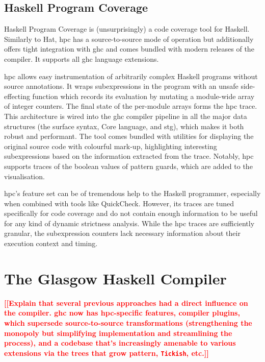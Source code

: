 \documentclass[thesis=B,english]{FITthesis}[2019/12/23]
\newcommand{\todo}[1]{\textcolor{red}{\textbf{[[#1]]}}}
\newcommand{\blind}[1][1]{\textcolor{gray}{\Blindtext[#1][1]}}
\newcommand{\hsIdent}[1]{\texttt{#1}}
\begin{document}
\subsection{Haskell Program Coverage} \label{sec:hpc}
Haskell Program Coverage\cite{hpc-paper} is (unsurprisingly) a code coverage
tool for Haskell. Similarly to Hat, \acrshort{hpc} has a source-to-source mode
of operation but additionally offers tight integration with \acrshort{ghc} and
comes bundled with modern releases of the compiler. It supports all
\acrshort{ghc} language extensions.

\acrshort{hpc} allows easy instrumentation of arbitrarily complex Haskell
programs without source annotations. It wraps subexpressions in the program
with an unsafe side-effecting function which records its evaluation by mutating
a module-wide array of integer counters. The final state of the per-module
arrays forms the \acrshort{hpc} trace. This architecture is wired into the
\acrshort{ghc} compiler pipeline in all the major data structures (the surface
syntax, Core language, and \acrshort{stg}), which makes it both robust and
per\-for\-mant. The tool comes bundled with utilities for displaying the
original source code with colourful mark-up, highlighting interesting
subexpressions based on the information extracted from the trace. Notably,
\acrshort{hpc} supports traces of the boolean values of pattern guards, which
are added to the visualisation.

\acrshort{hpc}'s feature set can be of tremendous help to the Haskell
programmer, especially when combined with tools like
QuickCheck\cite{quickcheck-paper}. However, its traces are tuned specifically
for code coverage and do not contain enough information to be useful for any
kind of dynamic strictness analysis. While the \acrshort{hpc} traces are
sufficiently granular, the subexpression counters lack necessary information
about their execution context and timing.


\section{The Glasgow Haskell Compiler} \label{sec:ghc}
\todo{Explain that several previous approaches had a direct influence on the
compiler. \acrshort{ghc} now has \acrshort{hpc}-specific features, compiler plugins, which
supersede source-to-source transformations (strengthening the monopoly but
simplifying implementation and streamlining the process), and a codebase that's
increasingly amenable to various extensions via the trees that grow pattern,
\hsIdent{Tickish}, etc.}
\blind[1]
\end{document}
